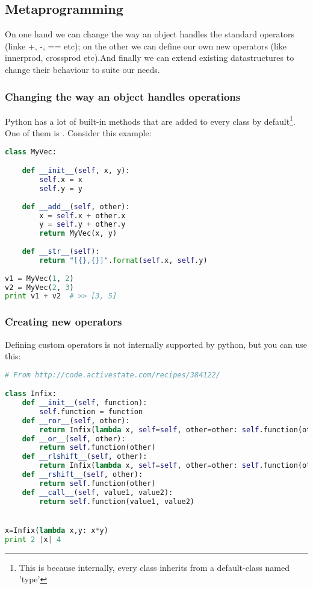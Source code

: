 \subsection{Metaprogramming}

On one hand we can change the way an object handles the standard operators (linke +, -, == etc); on the other we can define our own new operators (like innerprod, crossprod etc).And finally we can extend existing datastructures to change their behaviour to suite our needs. 

\subsubsection{Changing the way an object handles operations}

Python has a lot of built-in methods that are added to every class by default\footnote{This is because internally, every class inherits from a default-class named 'type'}. One of them is .
Consider this example: 

\begin{lstlisting}[language=python]
class MyVec:

	def __init__(self, x, y):
		self.x = x
		self.y = y
		
	def __add__(self, other):
		x = self.x + other.x
		y = self.y + other.y
		return MyVec(x, y)
		
	def __str__(self):
		return "[{},{}]".format(self.x, self.y)
		
v1 = MyVec(1, 2)
v2 = MyVec(2, 3)
print v1 + v2  # >> [3, 5]
\end{lstlisting}


\subsubsection{Creating new operators}

Defining custom operators is not internally supported by python, but you can use this: 

\begin{lstlisting}[language=python]
# From http://code.activestate.com/recipes/384122/

class Infix:
    def __init__(self, function):
        self.function = function
    def __ror__(self, other):
        return Infix(lambda x, self=self, other=other: self.function(other, x))
    def __or__(self, other):
        return self.function(other)
    def __rlshift__(self, other):
        return Infix(lambda x, self=self, other=other: self.function(other, x))
    def __rshift__(self, other):
        return self.function(other)
    def __call__(self, value1, value2):
        return self.function(value1, value2)


x=Infix(lambda x,y: x*y)
print 2 |x| 4
\end{lstlisting}

